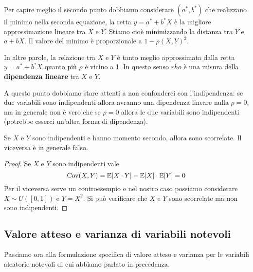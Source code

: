 Per capire meglio il secondo punto dobbiamo considerare $(a^*,b^*)$ che realizzano il minimo
nella seconda equazione, la retta $y = a^* + b^* X$ è la migliore approssimazione lineare tra
$X$ e $Y$. Stiamo cioè minimizzando la distanza tra $Y$ e $a+bX$. Il valore del minimo è
proporzionale a $1 - \rho(X,Y)^2$.

In altre parole, la relazione tra $X$ e $Y$ è tanto meglio approssimata dalla retta $y=a^*+b^*X$
quanto più $\rho$ è vicino a 1. In questo senso $rho$ è una misura della \textbf{dipendenza lineare}
tra $X$ e $Y$.

A questo punto dobbiamo stare attenti a non confonderci con l'indipendenza: se due variabili sono
indipendenti allora avranno una dipendenza lineare nulla $\rho=0$, ma in generale non è vero che
se $\rho=0$ allora le due variabili sono indipendenti (potrebbe esserci un'altra forma di
dipendenza).

\begin{proposition}
	Se $X$ e $Y$ sono indipendenti e hanno momento secondo, allora sono scorrelate. Il viceversa è
	in generale falso.
	\begin{proof}
		Se $X$ e $Y$ sono indipendenti vale
		\[ \operatorname{Cov}(X,Y) = \mathbb{E}[X \cdot Y] - \mathbb{E}[X] \cdot \mathbb{E}[Y] = 0 \]
		Per il viceversa serve un controesempio e nel nostro caso possiamo considerare
		$X \sim U([0,1])$ e $Y = X^2$. Si può verificare che $X$ e $Y$ sono scorrelate ma non sono
		indipendenti.
	\end{proof}
\end{proposition}

\subsection{Valore atteso e varianza di variabili notevoli}
Passiamo ora alla formulazione specifica di valore atteso e varianza per le variabili aleatorie
notevoli di cui abbiamo parlato in precedenza.

